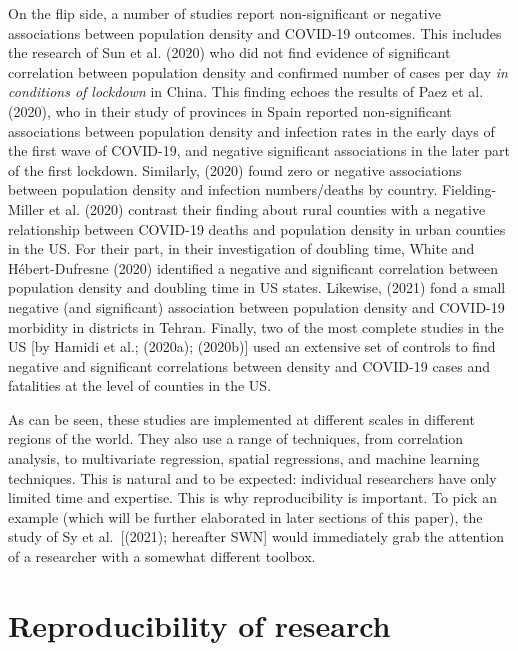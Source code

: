 \documentclass[]{elsarticle} %
\begin{document}
On the flip side, a number of studies report non-significant or negative
associations between population density and COVID-19 outcomes. This
includes the research of Sun et al. (2020) who did not find evidence of
significant correlation between population density and confirmed number
of cases per day \emph{in conditions of lockdown} in China. This finding
echoes the results of Paez et al. (2020), who in their study of
provinces in Spain reported non-significant associations between
population density and infection rates in the early days of the first
wave of COVID-19, and negative significant associations in the later
part of the first lockdown. Similarly, (2020) found zero or negative
associations between population density and infection numbers/deaths by
country. Fielding-Miller et al. (2020) contrast their finding about
rural counties with a negative relationship between COVID-19 deaths and
population density in urban counties in the US. For their part, in their
investigation of doubling time, White and Hébert-Dufresne (2020)
identified a negative and significant correlation between population
density and doubling time in US states. Likewise, (2021) fond a small
negative (and significant) association between population density and
COVID-19 morbidity in districts in Tehran. Finally, two of the most
complete studies in the US {[}by Hamidi et al.; (2020a); (2020b){]} used
an extensive set of controls to find negative and significant
correlations between density and COVID-19 cases and fatalities at the
level of counties in the US.

As can be seen, these studies are implemented at different scales in
different regions of the world. They also use a range of techniques,
from correlation analysis, to multivariate regression, spatial
regressions, and machine learning techniques. This is natural and to be
expected: individual researchers have only limited time and expertise.
This is why reproducibility is important. To pick an example (which will
be further elaborated in later sections of this paper), the study of Sy
et al.~{[}(2021); hereafter SWN{]} would immediately grab the attention
of a researcher with a somewhat different toolbox.

\hypertarget{reproducibility-of-research}{%
\section{Reproducibility of
research}\label{reproducibility-of-research}}
\end{document}
